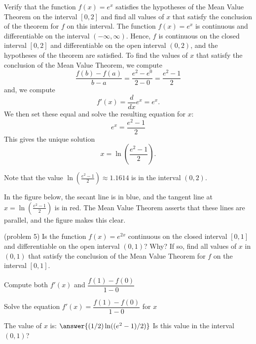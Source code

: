 \documentclass[handout]{ximera}
\begin{document}
\begin{example}[example 5]
Verify that the function $f(x) = e^x$ satisfies the hypotheses of the Mean Value Theorem
on the interval $[0,2]$ and find all values of $x$ that satisfy the conclusion of the theorem for $f$ on this interval.
The function $f(x) = e^x$ is continuous and differentiable on the interval $(-\infty, \infty)$. 
Hence, $f$ is continuous on the closed interval $[0, 2]$ and differentiable on the open interval $(0, 2)$, and the hypotheses of the theorem are satisfied.
To find the values of $x$ that satisfy the conclusion of the Mean Value Theorem, we compute
\[\frac{f(b) - f(a)}{b-a} = \frac{e^2 - e^0}{2-0} = \frac{e^2 - 1}{2}\]
and, we compute
\[f'(x) = \frac{d}{dx} e^x = e^x.\]
We then set these equal and solve the resulting equation for $x$:
\[e^x = \frac{e^2 - 1}{2}\]
This gives the unique solution
\[ x = \ln(\frac{e^2 - 1}{2}).\]

Note that the value $\ln(\frac{e^2 - 1}{2}) \approx 1.1614$ is in the interval $(0,2)$.

In the figure below, the secant line is in blue, 
and the tangent line at $x = \ln(\frac{e^2 - 1}{2})$ is in red. The Mean Value Theorem asserts that these lines are parallel, and the figure makes this clear.

\begin{image}
\end{image}

\end{example}


\begin{problem}(problem 5)
  Is the function $f(x) = e^{2x}$ continuous on the closed interval $[0,1]$ and differentiable on the open interval $(0,1)$? Why?
  If so, find all values of $x$ in $(0,1)$ that satisfy the conclusion of the Mean Value Theorem for $f$ on the interval $[0,1]$.

    \begin{hint}
      Compute both $f'(x)$ and $\dfrac{f(1) - f(0)}{1-0}$
    \end{hint}
		\begin{hint}
		  Solve the equation $f'(x) = \dfrac{f(1) - f(0)}{1-0}$ for $x$
		\end{hint}
		
		The value of $x$ is:
		 $\answer{(1/2) \ln((e^2 -1)/2)}$
		 Is this value in the interval $(0,1)$?
\end{problem}
\end{document}
